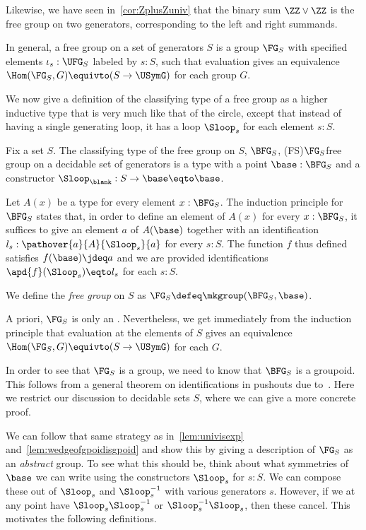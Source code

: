 Likewise, we have seen in~\cref{cor:ZplusZuniv} that the binary sum $\ZZ \vee \ZZ$
is the free group on two generators, corresponding to the left and right summands.

In general, a free group on a set of generators $S$ is a group $\FG_S$ with
specified elements $\iota_s:\UFG_S$ labeled by $s:S$,
such that evaluation gives an equivalence $\Hom(\FG_S,G) \equivto (S \to \USymG)$
for each group $G$.

We now give a definition of the classifying type of a free group
as a higher inductive type that is very much like that of the circle,
except that instead of having a single generating loop,
it has a loop $\Sloop_s$ for each element $s:S$.
\begin{definition}
  \label{def:bfree}
  Fix a set $S$.
  The classifying type of the free group on $S$, $\BFG_S$,%
  \glossary(FS){$\protect\FG_S$}{free group on a decidable set of generators}
  is a type with a point $\base : \BFG_S$ and
  a constructor ${\Sloop_\blank} : S \to \base\eqto\base$.

  Let $A(x)$ be a type for every element $x:\BFG_S$.
  The induction principle for $\BFG_S$ states that,
  in order to define an element of $A(x)$ for every $x:\BFG_S$,
  it suffices to give an element $a$ of $A(\base)$ together
  with an identification $l_s:\pathover{a}{A}{\Sloop_s}{a}$
  for every $s:S$.
  The function $f$ thus defined satisfies $f(\base)\jdeq a$
  and we are provided identifications $\apd{f}(\Sloop_s)\eqto l_s$ for each $s:S$.

  We define the \emph{free group} on $S$ as $\FG_S \defeq \mkgroup(\BFG_S,\base)$.
\end{definition}

A priori, $\FG_S$ is only an \inftygp.
Nevertheless, we get immediately from the induction principle
that evaluation at the elements of $S$
gives an equivalence $\Hom(\FG_S,G) \equivto (S \to \USymG)$ for each
\inftygp $G$.

In order to see that $\FG_S$ is a group,
we need to know that $\BFG_S$ is a groupoid.
This follows from a general theorem on identifications in pushouts due to~\textcite{Warn2023}.
Here we restrict our discussion to decidable sets $S$,
where we can give a more concrete proof.

We can follow that same strategy as in~\cref{lem:univisexp}
and~\cref{lem:wedgeofgpoidisgpoid}
and show this by giving a description of $\FG_S$ as an \emph{abstract} group.
To see what this should be, think about what symmetries of $\base$
we can write using the constructors $\Sloop_s$ for $s:S$.
We can compose these out of $\Sloop_s$ and $\Sloop_s^{-1}$
with various generators $s$.
However, if we at any point have $\Sloop_s\Sloop_s^{-1}$ or $\Sloop_s^{-1}\Sloop_s$,
then these cancel.
This motivates the following definitions.

